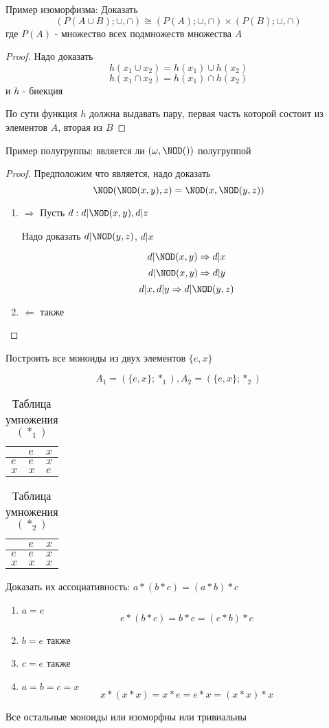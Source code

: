 \documentclass[../main/document.tex]{subfiles}
\begin{document}
\begin{exm}
Пример изоморфизма:
Доказать
$$(P(A\cup B);\cup,\cap)\cong (P(A);\cup,\cap)\times (P(B);\cup,\cap)$$
где $P(A)$ - множество всех подмножеств множества $A$
\begin{proof}
Надо доказать
$$h(x_1\cup x_2)=h(x_1)\cup h(x_2)$$
$$h(x_1\cap x_2)=h(x_1)\cap h(x_2)$$
и $h$ - биекция

По сути функция $h$ должна выдавать пару, первая часть которой состоит из элементов $A$, вторая из $B$
\end{proof}
\end{exm}
\begin{exm}
Пример полугруппы: является ли $(\omega,\NOD())$ полугруппой
\begin{proof}
Предположим что является, надо доказать
$$\NOD(\NOD(x,y),z)=\NOD(x,\NOD(y,z))$$
\begin{enumerate}
\item $\Rightarrow$
Пусть $d: d|\NOD(x,y), d|z$

Надо доказать $d|\NOD(y,z)$, $d|x$

$$d|\NOD(x,y)\Rightarrow d|x$$
$$d|\NOD(x,y)\Rightarrow d|y$$
$$d|x,d|y\Rightarrow d|\NOD(y,z)$$
\item $\Leftarrow$ также
\end{enumerate}
\end{proof}
\end{exm}
\begin{exm}
Построить все моноиды из двух элементов $\{e,x\}$

$$A_1=(\{e,x\};*_1), A_2=(\{e,x\};*_2)$$

\begin{table}[h]
\centering
\caption*{Таблица умножения $(*_1)$}
\renewcommand*{\arraystretch}{1.4}
\begin{tabular}{|l|l|l|}
\hline
  & $e$ & $x$  \\ \hline
$e$ & $e$ & $x$  \\ \hline
$x$ & $x$ & $e$ \\ 
\hline
\end{tabular}
\end{table}

\begin{table}[h]
\centering
\caption*{Таблица умножения $(*_2)$}
\renewcommand*{\arraystretch}{1.4}
\begin{tabular}{|l|l|l|}
\hline
  & $e$ & $x$  \\ \hline
$e$ & $e$ & $x$  \\ \hline
$x$ & $x$ & $x$ \\ 
\hline
\end{tabular}
\end{table}

Доказать их ассоциативность: $a*(b*c)=(a*b)*c$
\begin{enumerate}
\item $a=e$
$$e*(b*c)=b*c=(e*b)*c$$
\item $b=e$ также
\item $c=e$ также
\item $a=b=c=x$
$$x*(x*x)=x*e=e*x=(x*x)*x$$
\end{enumerate}
Все остальные моноиды или изоморфны или тривиальны
\end{exm}
\end{document}
